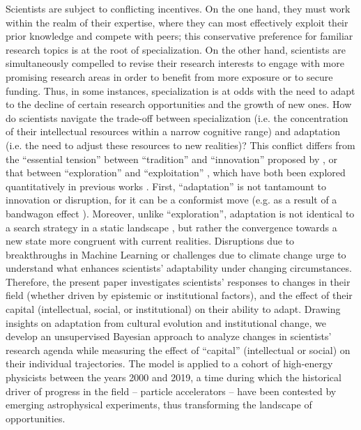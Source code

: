 \documentclass{article}
\begin{document}
Scientists are subject to conflicting incentives. On the one hand, they must work within the realm of their expertise, where they can most effectively exploit their prior knowledge and compete with peers; this conservative preference for familiar research topics is at the root of specialization. On the other hand, scientists are simultaneously compelled to revise their research interests to engage with more promising research areas in order to benefit from more exposure or to secure funding. Thus, in some instances, specialization is at odds with the need to adapt to the decline of certain research opportunities and the growth of new ones. How do scientists navigate the trade-off between specialization (i.e. the concentration of their intellectual resources within a narrow cognitive range) and adaptation (i.e. the need to adjust these resources to new realities)? This conflict differs from the ``essential tension'' between ``tradition'' and ``innovation'' proposed by \citet{Kuhn1997}, or that between ``exploration'' and ``exploitation'' \citep{March1991}, which have both been explored quantitatively in previous works \citep{Foster2015,Jia2017,Aleta2019,Zeng2019,Tripodi2020,Chakresh2023,Feifan2023}%
. First, ``adaptation'' is not tantamount to innovation or disruption, for it can be a conformist move (e.g. as a result of a bandwagon effect \citep{Fujimura1988}). Moreover,  unlike ``exploration'', adaptation is not identical to a search strategy in a static landscape \citep{Galesic2023}, but rather the convergence towards a new state more congruent with current realities. Disruptions due to breakthroughs in Machine Learning or challenges due to climate change urge to understand what enhances scientists' adaptability under changing circumstances. Therefore, the present paper investigates scientists' responses to changes in their field (whether driven by epistemic or institutional factors), and the effect of their capital (intellectual, social, or institutional) on their ability to adapt. Drawing insights on adaptation from cultural evolution and institutional change, we develop an unsupervised Bayesian approach to analyze changes in scientists' research agenda while measuring the effect of ``capital'' (intellectual or social) on their individual trajectories. The model is applied to a cohort of high-energy physicists between the years 2000 and 2019, a time during which the historical driver of progress in the field -- particle accelerators -- have been contested by emerging astrophysical experiments, thus transforming the landscape of opportunities.
\end{document}

